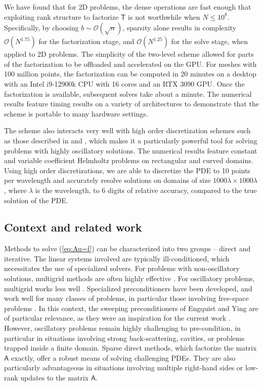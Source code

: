 \documentclass[10pt,a4paper]{amsart}
\newcommand{\mtx}[1]{\bm{\mathsf{#1}}}
\begin{document}
We have found that for 2D problems, the dense 
operations are fast enough that exploiting rank structure to factorize $\mtx T$ is not
worthwhile when $N \leq 10^8$. 
Specifically, by choosing $b \sim \mathcal O(\sqrt{n})$, sparsity alone results in complexity $\mathcal O(N^{1.75})$ for the factorization stage, and $\mathcal O(N^{1.25})$ for the solve stage, when applied to 2D problems.
The simplicity of the two-level scheme allowed for parts of the factorization to 
be offloaded and accelerated on the GPU.
For meshes with 100 million points, the factorization can
be computed in 20 minutes on a desktop with an Intel i9-12900k CPU with 16 cores and an RTX 3090 GPU.
Once the factorization is available, subsequent solves take about a minute.
The numerical results feature timing results on a variety of architectures
to demonstrate that the scheme is portable to many hardware settings.

The scheme also interacts very well with high order discretization schemes such as those
described in \cite{2012_spectralcomposite} and \cite[Ch.~25]{2019_martinsson_book},
which makes it a particularly powerful tool for solving problems with highly oscillatory solutions.
The numerical results feature constant and variable coefficient 
Helmholtz problems on rectangular and curved domains. Using high order discretizations, we are able to 
discretize the PDE to 10 points per wavelength and accurately resolve
solutions on domains of size
$1000\lambda \times 1000\lambda$, where $\lambda$ is the wavelength,
to 6 digits of relative accuracy, compared to the true solution of the PDE. 


\subsection{Context and related work}

Methods to solve (\ref{eq:Au=f}) can be characterized into two groups -- direct and iterative. 
The linear systems involved are typically ill-conditioned, which necessitates the use of specialized solvers. 
For problems with non-oscillatory solutions, multigrid methods are often highly effective
\cite{mccormick_multigrid,1987_ruge_algebraic,2017_xu_algebraic}.
For oscillatory problems, multigrid works less well \cite{ernst2012difficult}. 
Specialized preconditioners have been developed, and work well for many classes of problems, in particular those involving free-space problems \cite{gander2019class,gander2007optimized,erlangga2004class,erlangga2006comparison}.
In this context, the sweeping preconditioners of Engquist and Ying are of particular relevance, as they were an inspiration for the current work \cite{2011_engquist_ying,2011_engquist_ying_PML}.
However, oscillatory problems remain highly challenging to pre-condition, in particular in situations involving strong back-scattering, cavities, or problems trapped inside a finite domain.
Sparse direct methods, which factorize the matrix $\mtx A$ exactly, offer a robust means of solving challenging PDEs. 
They are also particularly advantageous in situations involving multiple right-hand sides or low-rank updates to the matrix $\mtx A$.
\end{document}
